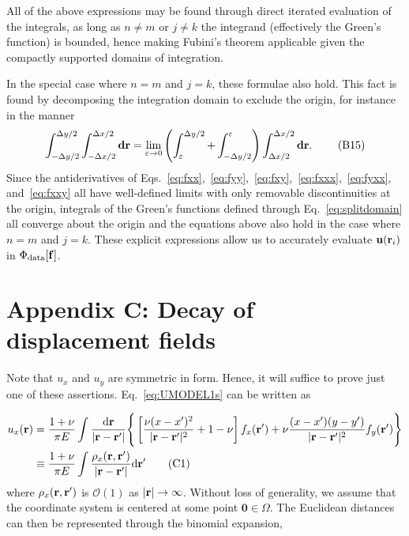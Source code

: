 \documentclass[aps,prl,reprint,groupedaddress,twocolumn]{revtex4-1}
\def\d{{\bf d}}
\def\dd{\mbox{d}}
\def\f{{\bf f}}
\def\r{{\bf r}}
\def\u{{\bf u}}
\begin{document}
\begin{appendix}
All of the above expressions may be found through direct iterated
evaluation of the integrals, as long as $n\neq m$ or $j\neq k$ the
integrand (effectively the Green's function) is bounded, hence making
Fubini's theorem applicable given the compactly supported domains of
integration.

In the special case where $n=m$ and $j=k$, these formulae also
hold. This fact is found by decomposing the integration domain to
exclude the origin, for instance in the manner
\begin{equation}
\int_{ -\Delta y/2 }^{\Delta y/2 }\int_{- \Delta x/2 }^{\Delta x/2 } \d\r = 
\lim_{\varepsilon\to0} \left( \int_\varepsilon^{\Delta y/2}  
+  \int_{-\Delta y/2}^\varepsilon   \right)\int_{\Delta x/2}^{\Delta x/2} \d\r.~\label{eq:splitdomain}\tag{B15}
\end{equation}
Since the antiderivatives of
Eqs.~\ref{eq:fxx},~\ref{eq:fyy},~\ref{eq:fxy},~\ref{eq:fxxx},~\ref{eq:fyxx},
and~\ref{eq:fxxy} all have well-defined limits with only removable
discontinuities at the origin, integrals of the Green's functions
defined through Eq.~\ref{eq:splitdomain} all converge about the origin
and the equations above also hold in the case where $n=m$ and $j=k$.
These explicit expressions allow us to accurately evaluate
$\u(\r_{i})$ in $\Phi_{\rm data}[\f]$.

\section*{Appendix C: Decay of displacement fields}

Note that $u_x$ and $u_y$ are symmetric in form. Hence, it will
suffice to prove just one of these assertions. Eq.~\ref{eq:UMODEL1s}
can be written as

\begin{align}
u_x(\r) & = \frac{1+\nu}{\pi E} \int \frac{\dd \r}{|\r-\r'|} 
\Bigg\{ \left[ \frac{\nu(x - x')^2}{|\r-\r'|^2} + 1-\nu \right]f_{x}(\r') +
\nu\frac{(x-x')(y-y')}{|\r-\r'|^2} f_y(\r')  \Bigg\} \nonumber\\
& \equiv \frac{1+\nu}{\pi E}   \int\frac{\rho_x(\r,\r')}{|\r-\r'|} \dd \r' \label{eq:rhoeq}\tag{C1}
\end{align}
where $\rho_x(\r,\r')$ is $\mathcal{O}(1)$ as
$\vert\r\vert\to\infty$. Without loss of generality, we assume that
the coordinate system is centered at some point
$\mathbf{0}\in\Omega$. The Euclidean distances can then be represented
through the binomial expansion,


\end{appendix}
\end{document}

